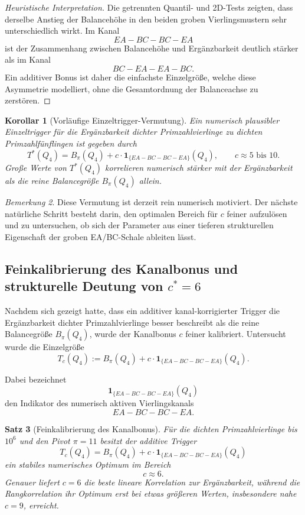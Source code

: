 \documentclass[11pt,a4paper]{article}
\newtheorem{satz}{Satz}
\newtheorem{korollar}[satz]{Korollar}
\theoremstyle{definition}
\theoremstyle{remark}
\newtheorem{bemerkung}[satz]{Bemerkung}
\begin{document}
	\begin{proof}[Heuristische Interpretation]
		Die getrennten Quantil- und 2D-Tests zeigten, dass derselbe Anstieg der Balancehöhe in den
		beiden groben Vierlingsmustern sehr unterschiedlich wirkt. Im Kanal
		\[
		EA-BC-BC-EA
		\]
		ist der Zusammenhang zwischen Balancehöhe und Ergänzbarkeit deutlich stärker als im Kanal
		\[
		BC-EA-EA-BC.
		\]
		Ein additiver Bonus ist daher die einfachste Einzelgröße, welche diese Asymmetrie
		modelliert, ohne die Gesamtordnung der Balanceachse zu zerstören.
	\end{proof}
	
	\begin{korollar}[Vorläufige Einzeltrigger-Vermutung]
		\label{kor:einzeltrigger_vermutung}
		Ein numerisch plausibler Einzeltrigger für die Ergänzbarkeit dichter Primzahlvierlinge zu
		dichten Primzahlfünflingen ist gegeben durch
		\[
		\boxed{
			T^*(Q_4)=B_\pi(Q_4)+c\cdot \mathbf 1_{\{EA-BC-BC-EA\}}(Q_4),
			\qquad c\approx 5\text{ bis }10.
		}
		\]
		Große Werte von \(T^*(Q_4)\) korrelieren numerisch stärker mit der Ergänzbarkeit als die
		reine Balancegröße \(B_\pi(Q_4)\) allein.
	\end{korollar}
	
	\begin{bemerkung}
		Diese Vermutung ist derzeit rein numerisch motiviert. Der nächste natürliche Schritt
		besteht darin, den optimalen Bereich für \(c\) feiner aufzulösen und zu untersuchen, ob
		sich der Parameter aus einer tieferen strukturellen Eigenschaft der groben EA/BC-Schale
		ableiten lässt.
	\end{bemerkung}
	
	\subsection{Feinkalibrierung des Kanalbonus und strukturelle Deutung von \(c^*=6\)}
	
	Nachdem sich gezeigt hatte, dass ein additiver kanal-korrigierter Trigger die
	Ergänzbarkeit dichter Primzahlvierlinge besser beschreibt als die reine Balancegröße
	\(B_\pi(Q_4)\), wurde der Kanalbonus \(c\) feiner kalibriert. Untersucht wurde die
	Einzelgröße
	\[
	T_c(Q_4):=B_\pi(Q_4)+c\cdot \mathbf 1_{\{EA-BC-BC-EA\}}(Q_4).
	\]
	
	Dabei bezeichnet
	\[
	\mathbf 1_{\{EA-BC-BC-EA\}}(Q_4)
	\]
	den Indikator des numerisch aktiven Vierlingskanals
	\[
	EA-BC-BC-EA.
	\]
	
	\begin{satz}[Feinkalibrierung des Kanalbonus]
		\label{satz:feinkalibrierung_kanalbonus}
		Für die dichten Primzahlvierlinge bis \(10^6\) und den Pivot \(\pi=11\) besitzt der
		additive Trigger
		\[
		T_c(Q_4)=B_\pi(Q_4)+c\cdot \mathbf 1_{\{EA-BC-BC-EA\}}(Q_4)
		\]
		ein stabiles numerisches Optimum im Bereich
		\[
		c\approx 6.
		\]
		Genauer liefert \(c=6\) die beste lineare Korrelation zur Ergänzbarkeit, während die
		Rangkorrelation ihr Optimum erst bei etwas größeren Werten, insbesondere nahe \(c=9\),
		erreicht.
	\end{satz}
	
\end{document}
